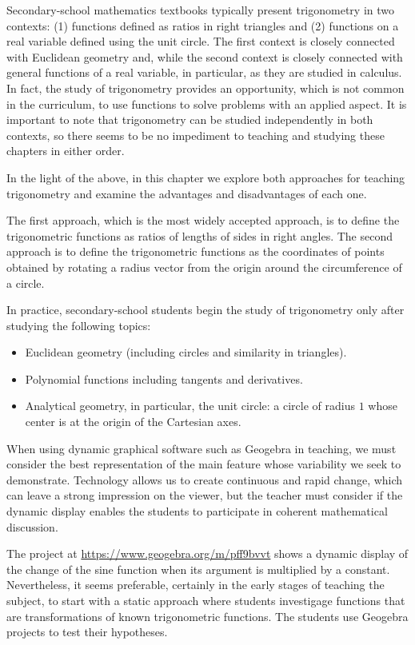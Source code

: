 Secondary-school mathematics textbooks typically present trigonometry in two contexts: (1) functions defined as ratios in right triangles and (2) functions on a real variable defined using the unit circle.
The first context is closely connected with Euclidean geometry and, while the second context is closely connected with general functions of a real variable, in particular, as they are studied in calculus.
In fact, the study of trigonometry provides an opportunity, which is not common in the curriculum, to use functions to solve problems with an applied aspect.
It is important to note that trigonometry can be studied independently in both contexts, so there seems to be no impediment to teaching and studying these chapters in either order.

In the light of the above, in this chapter we explore both approaches for teaching trigonometry and examine the advantages and disadvantages of each one.

The first approach, which is the most widely accepted approach, is to define the trigonometric functions as ratios of lengths of sides in right angles.
The second approach is to define the trigonometric functions as the coordinates of points obtained by rotating a radius vector from the origin around the circumference of a circle.

In practice, secondary-school students begin the study of trigonometry only after studying the following topics:
\begin{itemize}
\item Euclidean geometry (including circles and similarity in triangles).
\item Polynomial functions including tangents and derivatives.
\item Analytical geometry, in particular, the unit circle: a circle of radius $1$ whose center is at the origin of the Cartesian axes.
\end{itemize}


When using dynamic graphical software such as Geogebra in teaching, we must consider the best representation of the main feature whose variability we seek to demonstrate.
Technology allows us to create continuous and rapid change, which can leave a strong impression on the viewer, but the teacher must consider if the dynamic display enables the students to participate in coherent mathematical discussion.

The project at \url{https://www.geogebra.org/m/pff9bvvt} shows a dynamic display of the change of the sine function when its argument is multiplied by a constant.
Nevertheless, it seems preferable, certainly in the early stages of teaching the subject, to start with a static approach where students investigage functions that are transformations of known trigonometric functions.
The students use Geogebra projects to test their hypotheses.

